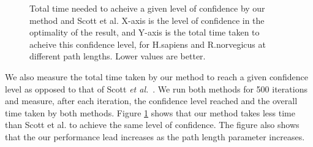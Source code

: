 \begin{figure}[h]
{}
\goodgap
{}
\caption{Total time needed to acheive a given level of confidence by our method
and Scott et al. X-axis is the level of confidence in the optimality of the
result, and Y-axis is the total time taken to acheive this confidence level,
for H.sapiens and R.norvegicus at different path lengths. Lower values are
better.}
\label{times}
\end{figure}



We also measure the total time taken by our method to reach a given
confidence level as opposed to that of Scott {\it et
  al.}~\cite{scott}. We run both methods for 500 iterations and
measure, after each iteration, the confidence level reached and the
overall time taken by both methods. Figure \ref{times} shows that our
method takes less time than Scott et al. to achieve the same level of
confidence. The figure also shows that the our performance lead
increases as the path length parameter increases.



